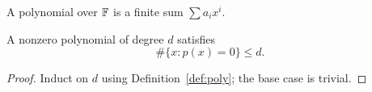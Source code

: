 \begin{definition}[Polynomial]\label{def:poly}
A polynomial over $\mathbb{F}$ is a finite sum $\sum a_i x^i$.
\end{definition}
\begin{lemma}\label{lem:roots}
A nonzero polynomial of degree $d$ satisfies
\begin{equation}\label{eq:deg}
\#\{x : p(x) = 0\} \le d .
\end{equation}
\end{lemma}
\begin{proof}
Induct on $d$ using Definition~\ref{def:poly}; %
the base case is trivial.
\end{proof}
